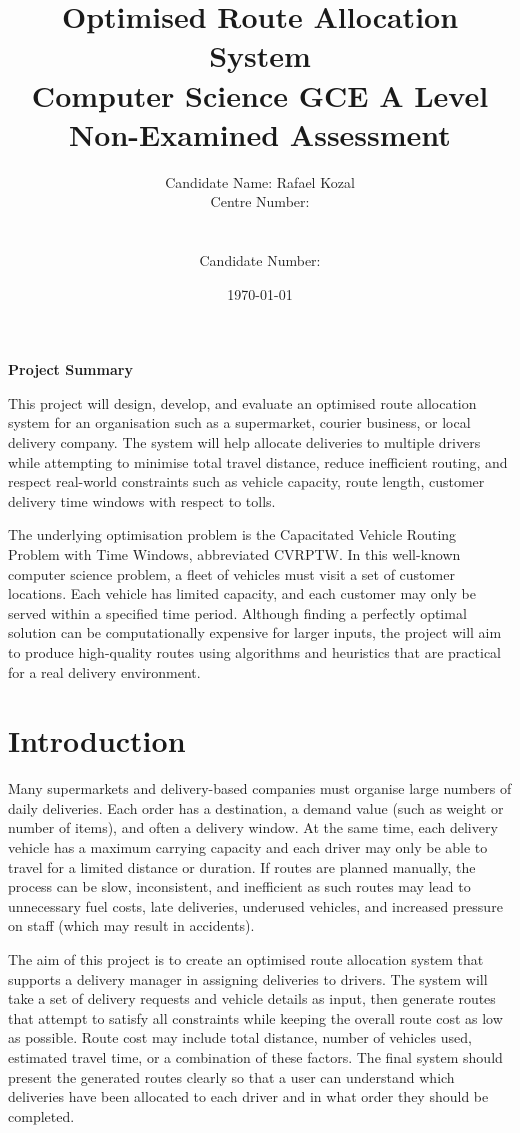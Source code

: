 \documentclass[11pt]{article}
\title{Optimised Route Allocation System\\\large Computer Science GCE A Level Non-Examined Assessment}
\author{Candidate Name: Rafael Kozal\\Centre Number: \rule{4cm}{0.4pt}\\Candidate Number: \rule{4cm}{0.4pt}}
\date{\today}
\begin{document}
\maketitle

\begin{center}
\textbf{Project Summary}
\end{center}

This project will design, develop, and evaluate an optimised route allocation system for an organisation such as a supermarket, courier business, or local delivery company. The system will help allocate deliveries to multiple drivers while attempting to minimise total travel distance, reduce inefficient routing, and respect real-world constraints such as vehicle capacity, route length, customer delivery time windows with respect to tolls.

The underlying optimisation problem is the Capacitated Vehicle Routing Problem with Time Windows, abbreviated CVRPTW. In this well-known computer science problem, a fleet of vehicles must visit a set of customer locations. Each vehicle has limited capacity, and each customer may only be served within a specified time period. Although finding a perfectly optimal solution can be computationally expensive for larger inputs, the project will aim to produce high-quality routes using algorithms and heuristics that are practical for a real delivery environment.

\newpage
\tableofcontents
\newpage    

\section{Introduction}

Many supermarkets and delivery-based companies must organise large numbers of daily deliveries. Each order has a destination, a demand value (such as weight or number of items), and often a delivery window. At the same time, each delivery vehicle has a maximum carrying capacity and each driver may only be able to travel for a limited distance or duration. If routes are planned manually, the process can be slow, inconsistent, and inefficient as such routes may lead to unnecessary fuel costs, late deliveries, underused vehicles, and increased pressure on staff (which may result in accidents).

The aim of this project is to create an optimised route allocation system that supports a delivery manager in assigning deliveries to drivers. The system will take a set of delivery requests and vehicle details as input, then generate routes that attempt to satisfy all constraints while keeping the overall route cost as low as possible. Route cost may include total distance, number of vehicles used, estimated travel time, or a combination of these factors. The final system should present the generated routes clearly so that a user can understand which deliveries have been allocated to each driver and in what order they should be completed.
\end{document}
